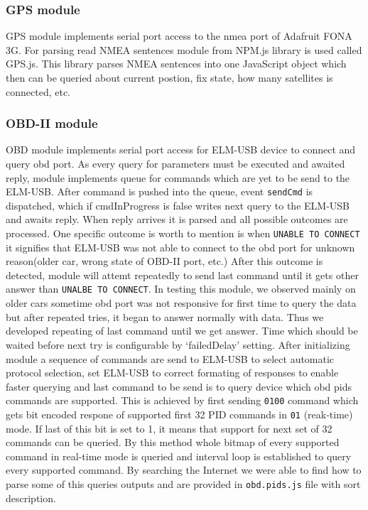 \subsubsection{GPS module} %
\label{ssub:gps_module}
GPS module implements serial port access to the nmea port of Adafruit FONA 3G. For parsing read NMEA sentences module from NPM.js library is used called GPS.js. This library parses NMEA sentences into one JavaScript object which then can be queried about current postion, fix state, how many satellites is connected, etc.
\subsubsection{OBD-II module} %
\label{ssub:obd_ii_module}
OBD module implements serial port access for ELM-USB device to connect and query \gls{obd} port. As every query for parameters must be executed and awaited reply, module implements queue for commands which are yet to be send to the ELM-USB. After command is pushed into the queue, event \verb|sendCmd| is dispatched, which if cmdInProgress is false writes next query to the ELM-USB and awaits reply. When reply arrives it is parsed and all possible outcomes are processed. One specific outcome is worth to mention is when \verb|UNABLE TO CONNECT| it signifies that ELM-USB was not able to connect to the \gls{obd} port for unknown reason(older car, wrong state of OBD-II port, etc.) After this outcome is detected, module will attemt repeatedly to send last command until it gets other answer than \verb|UNALBE TO CONNECT|. In testing this module, we observed mainly on older cars sometime \gls{obd} port was not responsive for first time to query the data but after repeated tries, it began to answer normally with data. Thus we developed repeating of last command until we get answer. Time which should be waited before next try is configurable by `failedDelay' setting. After initializing module a sequence of commands are send to ELM-USB to select automatic protocol selection, set ELM-USB to correct formating of responses to enable faster querying and last command to be send is to query device which \gls{obd} \gls{pids} commands are supported. This is achieved by first sending \verb|0100| command which gets bit encoded respone of supported first 32 PID commands in \verb|01| (reak-time) mode. If last of this bit is set to 1, it means that support for next set of 32 commands can be queried. By this method whole bitmap of every supported command in real-time mode is queried and interval loop is established to query every supported command. By searching the Internet we were able to find how to parse some of this queries outputs and are provided in \verb|obd.pids.js| file with sort description.
